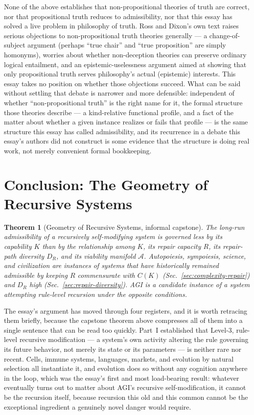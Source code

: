 \documentclass[12pt,a4paper]{article}
\theoremstyle{plain}
\newtheorem{theorem}{Theorem}[section]
\theoremstyle{definition}
\theoremstyle{remark}
\newcommand{\Adm}{\mathcal{A}}
\newcommand{\DR}{D_R}
\begin{document}
None of the above establishes that non-propositional theories of truth are correct, nor that propositional truth reduces to admissibility, nor that this essay has solved a live problem in philosophy of truth. Ross and Dixon's own text raises serious objections to non-propositional truth theories generally — a change-of-subject argument (perhaps ``true chair'' and ``true proposition'' are simply homonyms), worries about whether non-deception theories can preserve ordinary logical entailment, and an epistemic-uselessness argument aimed at showing that only propositional truth serves philosophy's actual (epistemic) interests. This essay takes no position on whether those objections succeed. What can be said without settling that debate is narrower and more defensible: independent of whether ``non-propositional truth'' is the right name for it, the formal structure those theories describe — a kind-relative functional profile, and a fact of the matter about whether a given instance realizes or fails that profile — is the same structure this essay has called admissibility, and its recurrence in a debate this essay's authors did not construct is some evidence that the structure is doing real work, not merely convenient formal bookkeeping.

\section{Conclusion: The Geometry of Recursive Systems}
\label{sec:conclusion}

\begin{theorem}[Geometry of Recursive Systems, informal capstone]
\label{thm:geometry-capstone}
The long-run admissibility of a recursively self-modifying system is governed less by its capability $K$ than by the relationship among $K$, its repair capacity $R$, its repair-path diversity $\DR$, and its viability manifold $\Adm$. Autopoiesis, sympoiesis, science, and civilization are instances of systems that have historically remained admissible by keeping $R$ commensurate with $C(K)$ (Sec.~\ref{sec:complexity-repair}) and $\DR$ high (Sec.~\ref{sec:repair-diversity}). AGI is a candidate instance of a system attempting rule-level recursion under the opposite conditions.
\end{theorem}

The essay's argument has moved through four registers, and it is worth retracing them briefly, because the capstone theorem above compresses all of them into a single sentence that can be read too quickly. Part~I established that Level-3, rule-level recursive modification — a system's own activity altering the rule governing its future behavior, not merely its state or its parameters — is neither rare nor recent. Cells, immune systems, languages, markets, and evolution by natural selection all instantiate it, and evolution does so without any cognition anywhere in the loop, which was the essay's first and most load-bearing result: whatever eventually turns out to matter about AGI's recursive self-modification, it cannot be the recursion itself, because recursion this old and this common cannot be the exceptional ingredient a genuinely novel danger would require.
\end{document}
